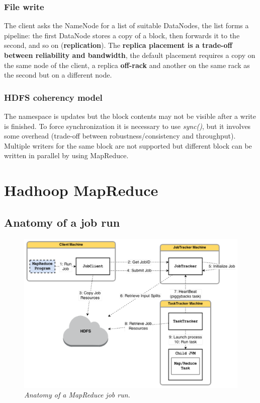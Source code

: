 	\subsubsection{File write}
		\par
		The client asks the NameNode for a list of suitable DataNodes, the list forms a pipeline: the first DataNode stores a copy of a block, then forwards it to the second, and so on (\textbf{replication}).
		\newline
		The \textbf{replica placement is a trade-off between reliability and bandwidth}, the default placement requires a copy on the same node of the client, a replica \textbf{off-rack} and another on the same rack as the second but on a different node.
	\subsubsection{HDFS coherency model}
		\par
		The namespace is updates but the block contents may not be visible after a write is finished. To force synchronization it is necessary to use \textit{sync()}, but it involves some overhead (trade-off between robustness/consistency and throughput).
		\newline
		Multiple writers for the same block are not supported but different block can be written in parallel by using MapReduce.

\section[Hadhoop MapReduce]{Hadhoop MapReduce\protect\footnotemark}
	\subsection{Anatomy of a job run}
		\begin{figure}[h!]
			\centering
			\includegraphics[width=\linewidth]{images/jobrun.png}
			\caption{\textit{Anatomy of a MapReduce job run.}}
		\end{figure}
